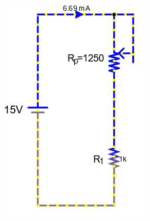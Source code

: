 \documentclass[a4paper]{article}
\begin{document}
\begin{figure}[H]
\begin{subfigure}{0.333\textwidth}
        \includegraphics[width=.9\linewidth]{pot5}
    \end{subfigure}
    \begin{subfigure}{0.333\textwidth}

\end{subfigure}
\end{figure}
\end{document}
